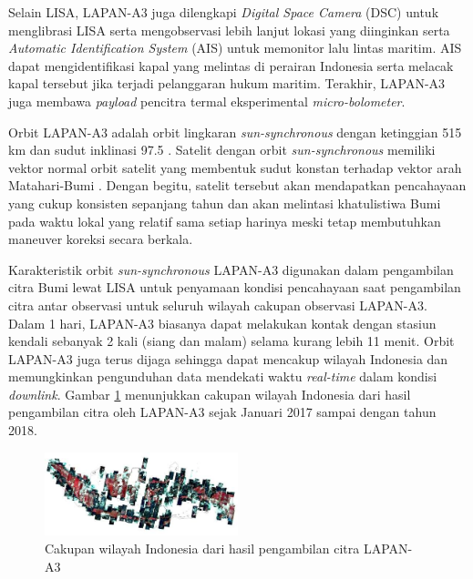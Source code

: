 Selain LISA, LAPAN-A3 juga dilengkapi \textit{Digital Space Camera} (DSC) untuk
menglibrasi LISA serta mengobservasi lebih lanjut lokasi yang diinginkan serta
\textit{Automatic Identification System} (AIS) untuk memonitor lalu lintas
maritim. AIS dapat mengidentifikasi kapal yang melintas di perairan Indonesia
serta melacak kapal tersebut jika terjadi pelanggaran hukum maritim. Terakhir,
LAPAN-A3 juga membawa \textit{payload} pencitra termal eksperimental
\textit{micro-bolometer}.

Orbit LAPAN-A3 adalah orbit lingkaran \textit{sun-synchronous} dengan
ketinggian 515 km dan sudut inklinasi 97.5 \degree. Satelit dengan orbit
\textit{sun-synchronous} memiliki vektor normal orbit satelit yang membentuk
sudut konstan terhadap vektor arah Matahari-Bumi \cite{mortari}. Dengan begitu,
satelit tersebut akan mendapatkan pencahayaan yang cukup konsisten sepanjang
tahun dan akan melintasi khatulistiwa Bumi pada waktu lokal yang relatif sama
setiap harinya meski tetap membutuhkan maneuver koreksi secara berkala.

Karakteristik orbit \textit{sun-synchronous} LAPAN-A3 digunakan dalam
pengambilan citra Bumi lewat LISA untuk penyamaan kondisi pencahayaan saat
pengambilan citra antar observasi untuk seluruh wilayah cakupan observasi
LAPAN-A3. Dalam 1 hari, LAPAN-A3 biasanya dapat melakukan kontak dengan stasiun
kendali sebanyak 2 kali (siang dan malam) selama kurang lebih 11 menit. Orbit
LAPAN-A3 juga terus dijaga sehingga dapat mencakup wilayah Indonesia dan
memungkinkan pengunduhan data mendekati waktu \textit{real-time} dalam kondisi
\textit{downlink}. Gambar \ref{fig:coverage} menunjukkan cakupan wilayah
Indonesia dari hasil pengambilan citra oleh LAPAN-A3 sejak Januari 2017 sampai
dengan tahun 2018. 

\begin{figure}[H]
\setlength{}
\begin{center}
\includegraphics[width=0.5\textwidth]{fig/coverage.png}
	\caption[Cakupan wilayah Indonesia dari hasil pengambilan citra LAPAN-A3]{Cakupan wilayah Indonesia dari hasil pengambilan citra LAPAN-A3~\cite{hakim2018}}
\label{fig:coverage}
\end{center}
\end{figure}

